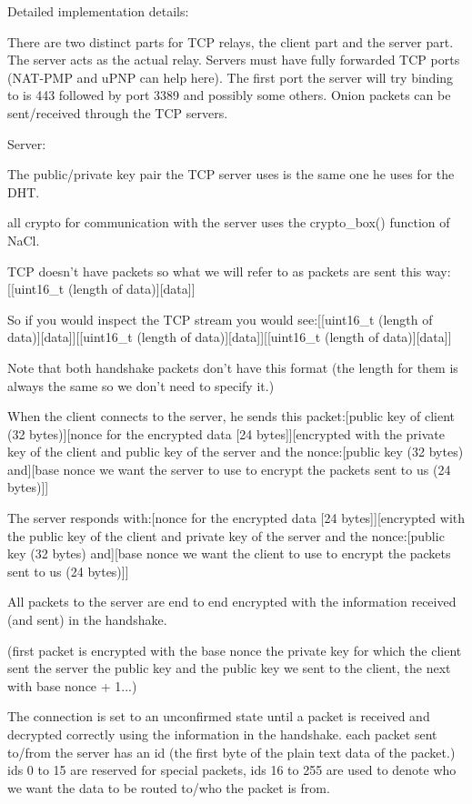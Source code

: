\documentclass{tox}
\begin{document}
Detailed implementation details:

There are two distinct parts for TCP relays, the client part and the server part.
The server acts as the actual relay. Servers must have fully forwarded TCP ports (NAT-PMP and uPNP can help here). The first port the server will try binding to is 443 followed by port 3389 and possibly some others. Onion packets can be sent/received through the TCP servers.

Server:

The public/private key pair the TCP server uses is the same one he uses for the DHT. 

all crypto for communication with the server uses the crypto_box() function of NaCl.

TCP doesn't have packets so what we will refer to as packets are sent this way: [[uint16_t (length of data)][data]]

So if you would inspect the TCP stream you would see:[[uint16_t (length of data)][data]][[uint16_t (length of data)][data]][[uint16_t (length of data)][data]]

Note that both handshake packets don't have this format (the length for them is always the same so we don't need to specify it.)

When the client connects to the server, he sends this packet:[public key of client (32 bytes)][nonce for the encrypted data [24 bytes]][encrypted with the private key of the client and public key of the server and the nonce:[public key (32 bytes) and][base nonce we want the server to use to encrypt the packets sent to us (24 bytes)]]

The server responds with:[nonce for the encrypted data [24 bytes]][encrypted with the public key of the client and private key of the server and the nonce:[public key (32 bytes) and][base nonce we want the client to use to encrypt the packets sent to us (24 bytes)]]

All packets to the server are end to end encrypted with the information received (and sent) in the handshake.

(first packet is encrypted with the base nonce the private key for which the client sent the server the public key and the public key we sent to the client, the next with base nonce + 1...)

The connection is set to an unconfirmed state until a packet is received and decrypted correctly using the information in the handshake.
each packet sent to/from the server has an id (the first byte of the plain text data of the packet.)
ids 0 to 15 are reserved for special packets, ids 16 to 255 are used to denote who we want the data to be routed to/who the packet is from.
\end{document}
